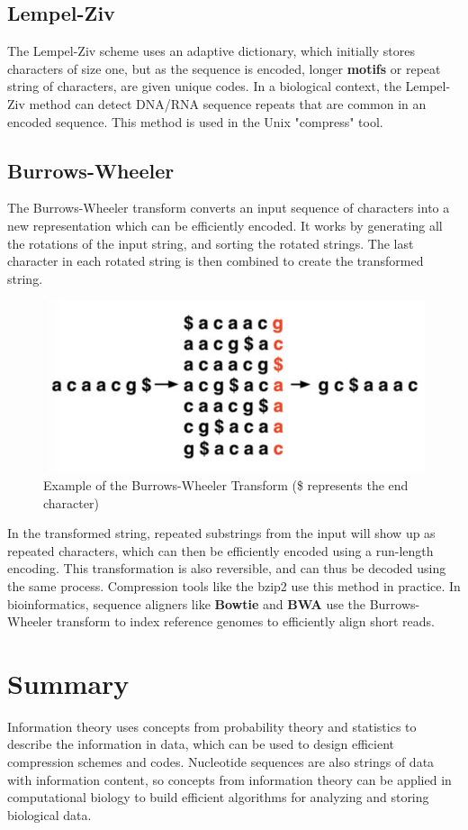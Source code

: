 \documentclass[12pt]{article}
\begin{document}
\subsection{Lempel-Ziv}
The Lempel-Ziv scheme uses an adaptive dictionary, which initially stores characters of size one, but as the sequence is encoded, longer \textbf{motifs} or repeat string of characters, are given unique codes. In a biological context, the Lempel-Ziv method can detect DNA/RNA sequence repeats that are common in an encoded sequence. This method is used in the Unix "compress" tool.
\subsection{Burrows-Wheeler}
The Burrows-Wheeler transform converts an input sequence of characters into a new representation which can be efficiently encoded. It works by generating all the rotations of the input string, and sorting the rotated strings. The last character in each rotated string is then combined to create the transformed string.
\begin{figure}[ht]
    \centering
    \includegraphics[width=.5\linewidth]{bw.png}
    \caption{Example of the Burrows-Wheeler Transform (\$ represents the end character)}
    \label{fig:my_label}
\end{figure}
In the transformed string, repeated substrings from the input will show up as repeated characters, which can then be efficiently encoded using a run-length encoding. This transformation is also reversible, and can thus be decoded using the same process. Compression tools like the bzip2 use this method in practice. In bioinformatics, sequence aligners like \textbf{Bowtie} and \textbf{BWA} use the Burrows-Wheeler transform to index reference genomes to efficiently align short reads.
\section{Summary}
Information theory uses concepts from probability theory and statistics to describe the information in data, which can be used to design efficient compression schemes and codes. Nucleotide sequences are also strings of data with information content, so concepts from information theory can be applied in computational biology to build efficient algorithms for analyzing and storing biological data.
\end{document}
